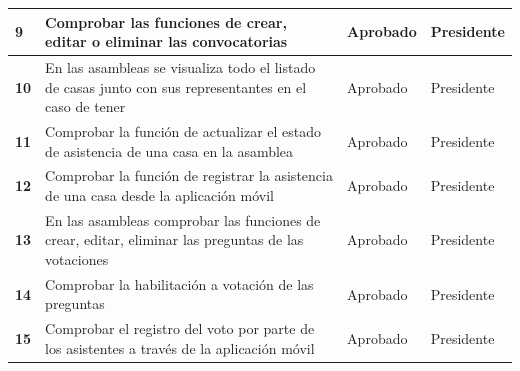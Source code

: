 \begin{spacing}{1}
\begin{center}
\begin{longtable}{ |>{\bfseries}l|p{}|l|l| }
        \hline
        9 & Comprobar las funciones de crear, editar o eliminar las convocatorias & Aprobado & Presidente\\
        \hline
        10 & En las asambleas se visualiza todo el listado de casas junto con sus representantes en el caso de tener & Aprobado & Presidente\\
        \hline
        11 & Comprobar la función de actualizar el estado de asistencia de una casa en la asamblea & Aprobado & Presidente\\
        \hline
        12 & Comprobar la función de registrar la asistencia de una casa desde la aplicación móvil & Aprobado & Presidente\\
        \hline
        13 & En las asambleas comprobar las funciones de crear, editar, eliminar las preguntas de las votaciones & Aprobado & Presidente\\
        \hline
        14 & Comprobar la habilitación a votación de las preguntas & Aprobado & Presidente\\
        \hline
        15 & Comprobar el registro del voto por parte de los asistentes a través de la aplicación móvil & Aprobado & Presidente\\
        \hline
    \end{longtable}\label{tab:pruebas-aceptacion-2}
    \end{center}
\end{spacing}

